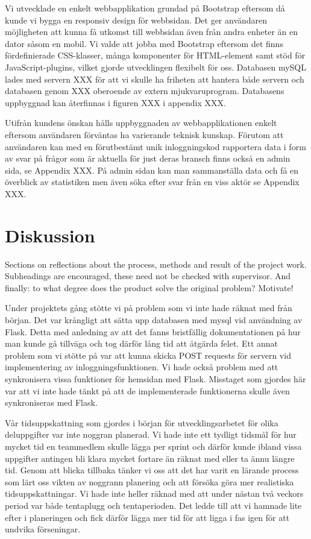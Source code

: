 \documentclass[12pt]{article}
\begin{document}
Vi utvecklade en enkelt webbapplikation grundad på Bootstrap eftersom då kunde vi bygga en responsiv design för webbsidan. Det ger användaren möjligheten att kunna få utkomst till webbsidan även från andra enheter än en dator såsom en mobil. Vi valde att jobba med Bootstrap eftersom det finns fördefinierade CSS-klasser, många komponenter för HTML-element samt stöd för JavaScript-plugins, vilket gjorde utvecklingen flexibelt för oss. Databasen mySQL lades med servern XXX för att vi skulle ha friheten att hantera både servern och databasen genom XXX oberoende av extern mjukvaruprogram. Databasens uppbyggnad kan återfinnas i figuren XXX i appendix XXX. 


Utifrån kundens önskan hålls uppbyggnaden av webbapplikationen enkelt eftersom användaren förväntas ha varierande teknisk kunskap. Förutom att användaren kan med en förutbestämt unik inloggningskod rapportera data i form av svar på frågor som är aktuella för just deras bransch finns också en admin sida, se Appendix XXX. På admin sidan kan man sammanställa data och få en överblick av statistiken men även söka efter svar från en viss aktör se Appendix XXX. 

\section{Diskussion}
Sections on reflections about the process, methods and result of the project work. Subheadings are encouraged, these need not be checked with supervisor. And finally: to what degree does the product solve the original problem? Motivate!

Under projektets gång stötte vi på problem som vi inte hade räknat med från början. Det var krångligt att sätta upp databasen med mysql vid användning av Flask. Detta med anledning av att det fanns bristfällig dokumentationen på hur man kunde gå tillväga och tog därför lång tid att åtgärda felet. Ett annat problem som vi stötte på var att kunna skicka POST requests för servern vid implementering av inloggningsfunktionen. Vi hade också problem med att synkronisera vissa funktioner för hemsidan med Flask. Misstaget som gjordes här var att vi inte hade tänkt på att de implementerade funktionerna skulle även synkroniseras med Flask. 

Vår tidsuppskattning som gjordes i början för utvecklingsarbetet för olika deluppgifter var inte noggran planerad. Vi hade inte ett tydligt tidsmål för hur mycket tid en teammedlem skulle lägga per sprint och därför kunde ibland vissa uppgifter antingen bli klara mycket fortare än räknat med eller ta ännu längre tid. Genom att blicka tillbaka tänker vi oss att det har varit en lärande process som lärt oss vikten av noggrann planering och att försöka göra mer realistiska tidsuppskattningar. Vi hade inte heller räknad med att under nästan två veckors period var både tentaplugg och tentaperioden. Det ledde till att vi hamnade lite efter i planeringen och fick därför lägga mer tid för att ligga i fas igen för att undvika förseningar. 
\end{document}
